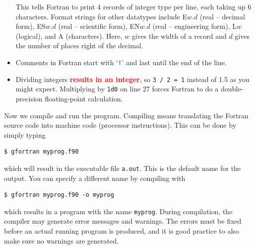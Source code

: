 \documentclass[openany,oneside]{report}
\begin{document}
\begin{itemize}
    This tells Fortran to print 4 records of integer type per line, each taking up 6 characters.
    Format strings for other datatypes include E$w.d$ (real -- decimal form), ES$w.d$ (real -- scientific form), EN$w.d$ (real -- engineering form), L$w$ (logical), and A (characters). Here, $w$ gives the width of a record and $d$ gives the number of places right of the decimal.
  \item Comments in Fortran start with `\texttt{!}' and last until the end of the line.
  \item Dividing integers \textcolor{red}{\textbf{results in an integer}}, so \texttt{3 / 2 = 1} instead of 1.5 as you might expect. 
    Multiplying by \texttt{1d0} on line 27 forces Fortran to do a double-precision floating-point calculation.
\end{itemize}
Now we compile and run the program.
Compiling means translating the Fortran source code into machine code (processor instructions).
This can be done by simply typing
\begin{verbatim}
$ gfortran myprog.f90
\end{verbatim}
which will result in the executable file \texttt{a.out}.
This is the default name for the output.
You can specify a different name by compiling with
\begin{verbatim}
$ gfortran myprog.f90 -o myprog
\end{verbatim}
which results in a program with the name \texttt{myprog}.
During compilation, the compiler may generate error messages and warnings.
The errors must be fixed before an actual running program is produced, and it is good practice to also make sure no warnings are generated.
\end{document}
